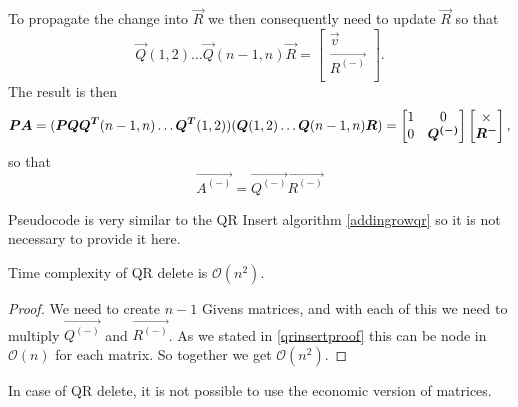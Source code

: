 To propagate the change into $\vec{R}$ we then consequently need to update $\vec{R}$ so that
\begin{equation}
    \vec{Q}(1,2) \ldots \vec{Q}(n-1,n) \vec{R} =   \begin{bmatrix}
        \vec{v} \\
        \vec{R^{(-)}}\\
    \end{bmatrix}.
\end{equation}
The result is then
\begin{equation}
    \vec{P}\vec{A} = (\vec{P}\vec{Q}  \vec{Q^T}(n-1,n) \ldots   \vec{Q^T}(1,2)) (\vec{Q}(1,2) \ldots \vec{Q}(n-1,n) \vec{R} ) \\
    = 
    \begin{bmatrix}
        1 & 0 \\
        0 & \vec{Q^{(-)}}
    \end{bmatrix}
    \begin{bmatrix}
        \times \\
        \vec{R^{-}}
    \end{bmatrix},
\end{equation}
so that 
\begin{equation}
    \vec{A^{(-)}} = \vec{Q^{(-)}}\vec{R^{(-)}}
\end{equation}

Pseudocode is very similar to the QR Insert algorithm \ref{addingrowqr} so it is not necessary to provide it here.

\begin{observation} \label{qrdeletetime}
Time complexity of QR delete is   $\mathcal{O}(n^2)$.
\end{observation}

\begin{proof}
We need to create $n-1$ Givens matrices, and with each of this we need to multiply $\vec{Q^{(-)}}$ and $\vec{R^{(-)}}$. As we stated in \ref{qrinsertproof} this can be node in $\mathcal{O}(n)$ for each matrix.
So together we get $\mathcal{O}(n^2)$.
\end{proof}

\begin{note}
In case of QR delete, it is not possible to use the economic version of matrices.
\end{note}







